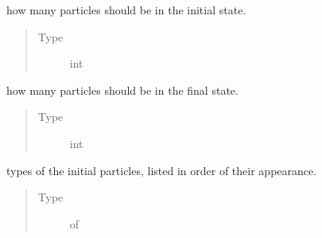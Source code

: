 \documentclass[letterpaper,10pt,english]{sphinxmanual}
\begin{document}
\begin{fulllineitems}
\begin{fulllineitems}
\begin{quote}
\begin{description}
\end{description}\end{quote}

\end{fulllineitems}


\begin{fulllineitems}
\label{\detokenize{code_structure:scdc.interaction.Interaction.n_initial}}
how many particles should be in the initial state.
\begin{quote}\begin{description}
\item[{Type}] \leavevmode
int

\end{description}\end{quote}

\end{fulllineitems}


\begin{fulllineitems}
\label{\detokenize{code_structure:scdc.interaction.Interaction.n_final}}
how many particles should be in the final state.
\begin{quote}\begin{description}
\item[{Type}] \leavevmode
int

\end{description}\end{quote}

\end{fulllineitems}


\begin{fulllineitems}
\label{\detokenize{code_structure:scdc.interaction.Interaction.initial}}
types of the initial particles,
listed in order of their appearance.
\begin{quote}\begin{description}
\item[{Type}] \leavevmode
{} of 


\end{description}
\end{quote}
\end{fulllineitems}
\end{fulllineitems}
\end{document}

